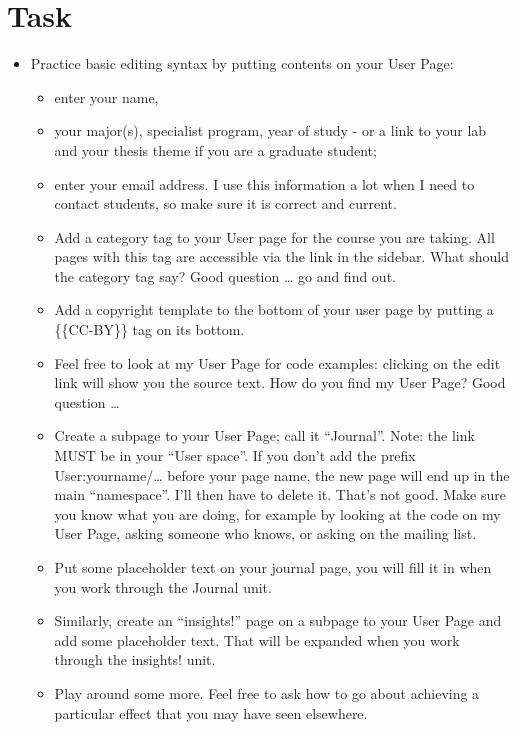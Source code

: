 \documentclass[]{book}
\providecommand{\tightlist}{%
  \setlength{\itemsep}{0pt}\setlength{\parskip}{0pt}}
\begin{document}
\section{Task}\label{task}

\begin{rmd-task}
\begin{itemize}
\tightlist
\item
  Practice basic editing syntax by putting contents on your User Page:

  \begin{itemize}
  \tightlist
  \item
    enter your name,
  \item
    your major(s), specialist program, year of study - or a link to your
    lab and your thesis theme if you are a graduate student;
  \item
    enter your email address. I use this information a lot when I need
    to contact students, so make sure it is correct and current.
  \item
    Add a category tag to your User page for the course you are taking.
    All pages with this tag are accessible via the link in the sidebar.
    What should the category tag say? Good question \ldots{} go and find
    out.
  \item
    Add a copyright template to the bottom of your user page by putting
    a \{\{CC-BY\}\} tag on its bottom.
  \item
    Feel free to look at my User Page for code examples: clicking on the
    edit link will show you the source text. How do you find my User
    Page? Good question \ldots{}
  \item
    Create a subpage to your User Page; call it ``Journal''. Note: the
    link MUST be in your ``User space''. If you don't add the prefix
    User:yourname/\ldots{} before your page name, the new page will end
    up in the main ``namespace''. I'll then have to delete it. That's
    not good. Make sure you know what you are doing, for example by
    looking at the code on my User Page, asking someone who knows, or
    asking on the mailing list.
  \item
    Put some placeholder text on your journal page, you will fill it in
    when you work through the Journal unit.
  \item
    Similarly, create an ``insights!'' page on a subpage to your User
    Page and add some placeholder text. That will be expanded when you
    work through the insights! unit.
  \item
    Play around some more. Feel free to ask how to go about achieving a
    particular effect that you may have seen elsewhere.
  \end{itemize}
\end{itemize}
\end{rmd-task}
\end{document}

